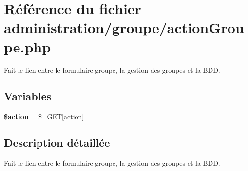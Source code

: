 \hypertarget{actionGroupe_8php}{}\section{Référence du fichier administration/groupe/action\+Groupe.php}
\label{actionGroupe_8php}


Fait le lien entre le formulaire groupe, la gestion des groupes et la B\+DD.  


\subsection*{Variables}
\begin{DoxyCompactItemize}
\item 
\mbox{\label{actionGroupe_8php_aa698a3e72116e8e778be0e95d908ee30}} 
{\bfseries \$action} = \$\+\_\+\+G\+ET\mbox{[}\textquotesingle{}action\textquotesingle{}\mbox{]}
\end{DoxyCompactItemize}


\subsection{Description détaillée}
Fait le lien entre le formulaire groupe, la gestion des groupes et la B\+DD. 

